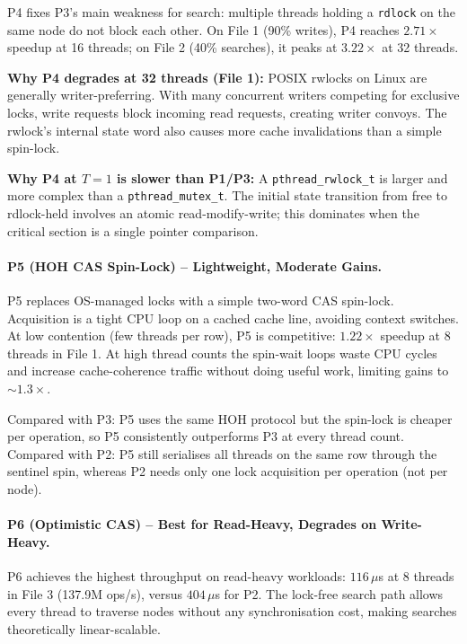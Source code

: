 \documentclass{article}
\begin{document}
P4 fixes P3's main weakness for search: multiple threads holding a
\texttt{rdlock} on the same node do not block each other. On File 1
(90\% writes), P4 reaches $2.71\times$ speedup at 16 threads; on
File 2 (40\% searches), it peaks at $3.22\times$ at 32 threads.

\textbf{Why P4 degrades at 32 threads (File 1):} POSIX rwlocks on Linux
are generally writer-preferring. With many concurrent writers competing
for exclusive locks, write requests block incoming read requests, creating
writer convoys. The rwlock's internal state word also causes more cache
invalidations than a simple spin-lock.

\textbf{Why P4 at $T=1$ is slower than P1/P3:} A \texttt{pthread\_rwlock\_t}
is larger and more complex than a \texttt{pthread\_mutex\_t}. The initial
state transition from free to rdlock-held involves an atomic read-modify-write;
this dominates when the critical section is a single pointer comparison.

\paragraph{P5 (HOH CAS Spin-Lock) -- Lightweight, Moderate Gains.}

P5 replaces OS-managed locks with a simple two-word CAS spin-lock.
Acquisition is a tight CPU loop on a cached cache line, avoiding context
switches. At low contention (few threads per row), P5 is competitive:
$1.22\times$ speedup at 8 threads in File 1. At high thread counts the
spin-wait loops waste CPU cycles and increase cache-coherence traffic
without doing useful work, limiting gains to $\sim1.3\times$.

Compared with P3: P5 uses the same HOH protocol but the spin-lock is
cheaper per operation, so P5 consistently outperforms P3 at every thread
count. Compared with P2: P5 still serialises all threads on the same row
through the sentinel spin, whereas P2 needs only one lock acquisition per
operation (not per node).

\paragraph{P6 (Optimistic CAS) -- Best for Read-Heavy, Degrades on Write-Heavy.}

P6 achieves the highest throughput on read-heavy workloads: $116\,\mu$s
at 8 threads in File 3 (137.9M ops/s), versus $404\,\mu$s for P2. The
lock-free search path allows every thread to traverse nodes without any
synchronisation cost, making searches theoretically linear-scalable.
\end{document}
